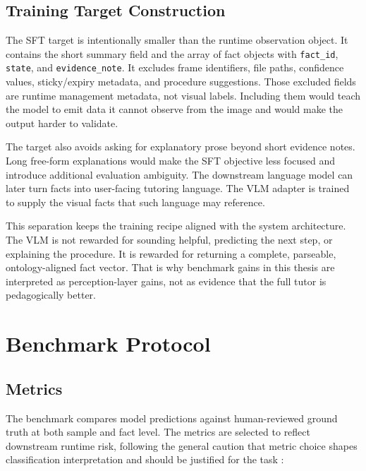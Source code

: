 \subsection{Training Target Construction}

The SFT target is intentionally smaller than the runtime observation object.
It contains the short summary field and the array of fact objects with
\texttt{fact\_id}, \texttt{state}, and \texttt{evidence\_note}. It excludes
frame identifiers, file paths, confidence values, sticky/expiry metadata, and
procedure suggestions. Those excluded fields are runtime management metadata,
not visual labels. Including them would teach the model to emit data it cannot
observe from the image and would make the output harder to validate.

The target also avoids asking for explanatory prose beyond short evidence
notes. Long free-form explanations would make the SFT objective less focused
and introduce additional evaluation ambiguity. The downstream language model
can later turn facts into user-facing tutoring language. The VLM adapter is
trained to supply the visual facts that such language may reference.

This separation keeps the training recipe aligned with the system architecture.
The VLM is not rewarded for sounding helpful, predicting the next step, or
explaining the procedure. It is rewarded for returning a complete, parseable,
ontology-aligned fact vector. That is why benchmark gains in this thesis are
interpreted as perception-layer gains, not as evidence that the full tutor is
pedagogically better.

\section{Benchmark Protocol}\label{sec:method-benchmark}

\subsection{Metrics}

The benchmark compares model predictions against human-reviewed ground truth at
both sample and fact level. The metrics are selected to reflect downstream
runtime risk, following the general caution that metric choice shapes
classification interpretation and should be justified for the task
\citep{powers2011evaluation,opitz2024metrics}:

